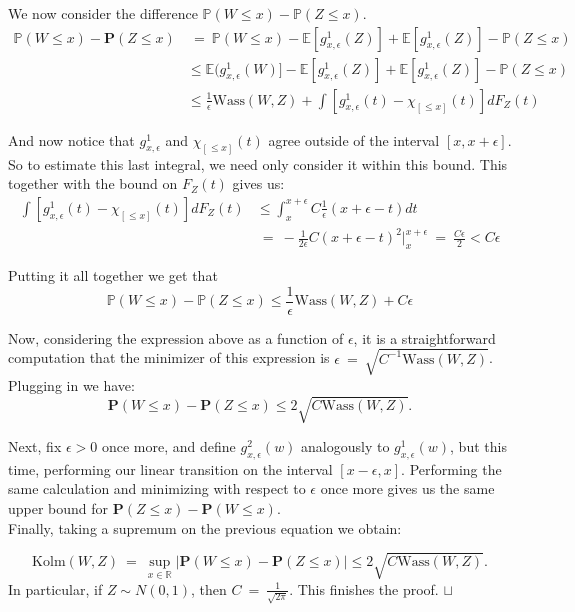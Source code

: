 \documentclass[12pt]{article}
\newcommand\qed{\hfill\hbox{\rlap{$\sqcap$}$\sqcup$}}
\newcommand{\eq }{\: = \:}
\theoremstyle{nonumberplain}
\begin{document}
We now consider the difference $\mathbb{P}(W\leq x)-\mathbb{P}(Z\leq x)$.
\begin{align*}
\mathbb{P}(W \leq x) - \textbf{P}(Z \leq x) &\eq  
\mathbb{P}(W \leq x) - \mathbb{E}[g_{x, \epsilon}^{1}(Z)] + \mathbb{E}[g_{x, \epsilon}^{1}(Z)]               -\mathbb{P}(Z\leq x)\\
& \leq \mathbb{E}(g_{x,\epsilon}^{1}(W)] - \mathbb{E}[g_{x,\epsilon}^{1}(Z)] +                                \mathbb{E}[g_{x,\epsilon}^{1}(Z)] - \mathbb{P}(Z\leq x)\\
& \leq \frac{1}{\epsilon} \mathrm{Wass}(W,Z) + \int [g_{x, \epsilon}^{1}(t) - \chi_{[\le x]}(t)]dF_Z(t)
\end{align*}

\pagebreak

And now notice that $g_{x, \epsilon}^{1}$ and $\chi_{[\le x]}(t)$ agree outside of the interval $[x , x + \epsilon]$. So to estimate this last integral, we need only consider it within this bound. This together with the bound on $F_Z(t)$ gives us:
\begin{align*}
\int [g_{x, \epsilon}^{1}(t) - \chi_{[\le x]}(t)]dF_Z(t) &\le 
\int_{x}^{x + \epsilon}C \frac{1}{\epsilon} (x  + \epsilon - t)dt \\
&\eq  - \frac{1}{2 \epsilon}C (x + \epsilon - t) ^ 2\left. \right|_{x}^{x + \epsilon} \eq  \frac{C \epsilon}{2}
 < C \epsilon
\end{align*}

Putting it all together we get that 
$$
\mathbb{P}(W \le x) - \mathbb{P}(Z \le x) \le \frac{1}{\epsilon} \mathrm{Wass} (W, Z) + C \epsilon
$$

Now, considering the expression above as a function of $\epsilon$, it is a straightforward computation that the minimizer of this expression is $\epsilon \eq \sqrt{C^{-1}\mathrm{Wass}(W,Z)}$. Plugging in we have: 
$$
\textbf{P}(W\leq x)-\textbf{P}(Z\leq x) \leq 2\sqrt{C\mathrm{Wass}(W,Z)}.
$$

Next, fix $\epsilon>0$ once more, and define $g_{x,\epsilon}^{2}(w)$ analogously to $g_{x,\epsilon}^{1}(w)$, but this time, performing our linear transition on the interval $[x - \epsilon, x]$. Performing the same calculation and minimizing with respect to $\epsilon$ once more gives us the same upper bound for $\textbf{P}(Z\leq x)-\textbf{P}(W\leq x)$.\\

Finally, taking a supremum on the previous equation we obtain:

\begin{equation}
\mathrm{Kolm}(W,Z)\eq \sup \limits_{x\in \mathbb{R}} |\textbf{P}(W\leq x)-\textbf{P}(Z\leq x)| \leq 2\sqrt{C\mathrm{Wass}(W,Z)}.
\end{equation}
In particular, if $Z\sim N(0,1)$, then $C\eq \frac{1}{\sqrt{2\pi}}$. This finishes the proof. 
\qed
\end{document}
